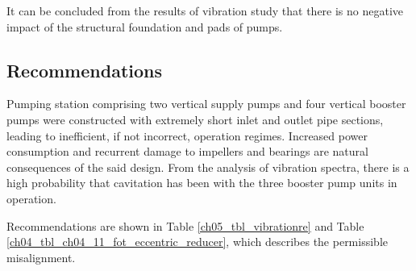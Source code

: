 It can be concluded from the results of vibration study that there is no negative impact of the structural foundation and pads of pumps. 


\subsection{Recommendations}
Pumping station comprising two vertical supply pumps and four vertical booster pumps were constructed with extremely short inlet and outlet pipe sections, leading to inefficient, if not incorrect, operation regimes. Increased power consumption and recurrent damage to impellers and bearings are natural consequences of the said design. From the analysis of vibration spectra, there is a high probability that cavitation has been with the three booster pump units in operation.


Recommendations are shown in Table \ref{ch05_tbl_vibrationre} and Table \ref{ch04_tbl_ch04_11_fot_eccentric_reducer}, which describes the permissible misalignment.


